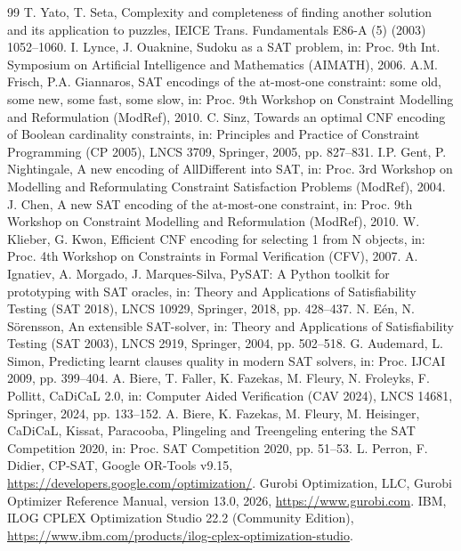 \begin{thebibliography}{99}
\small
{} T. Yato, T. Seta, Complexity and completeness of finding another solution and its application to puzzles, IEICE Trans. Fundamentals E86-A (5) (2003) 1052--1060.
 I. Lynce, J. Ouaknine, Sudoku as a SAT problem, in: Proc. 9th Int. Symposium on Artificial Intelligence and Mathematics (AIMATH), 2006.
 A.M. Frisch, P.A. Giannaros, SAT encodings of the at-most-one constraint: some old, some new, some fast, some slow, in: Proc. 9th Workshop on Constraint Modelling and Reformulation (ModRef), 2010.
 C. Sinz, Towards an optimal CNF encoding of Boolean cardinality constraints, in: Principles and Practice of Constraint Programming (CP 2005), LNCS 3709, Springer, 2005, pp. 827--831.
 I.P. Gent, P. Nightingale, A new encoding of AllDifferent into SAT, in: Proc. 3rd Workshop on Modelling and Reformulating Constraint Satisfaction Problems (ModRef), 2004.
 J. Chen, A new SAT encoding of the at-most-one constraint, in: Proc. 9th Workshop on Constraint Modelling and Reformulation (ModRef), 2010.
 W. Klieber, G. Kwon, Efficient CNF encoding for selecting 1 from N objects, in: Proc. 4th Workshop on Constraints in Formal Verification (CFV), 2007.
 A. Ignatiev, A. Morgado, J. Marques-Silva, PySAT: A Python toolkit for prototyping with SAT oracles, in: Theory and Applications of Satisfiability Testing (SAT 2018), LNCS 10929, Springer, 2018, pp. 428--437.
 N. E\'en, N. S\"orensson, An extensible SAT-solver, in: Theory and Applications of Satisfiability Testing (SAT 2003), LNCS 2919, Springer, 2004, pp. 502--518.
 G. Audemard, L. Simon, Predicting learnt clauses quality in modern SAT solvers, in: Proc. IJCAI 2009, pp. 399--404.
 A. Biere, T. Faller, K. Fazekas, M. Fleury, N. Froleyks, F. Pollitt, CaDiCaL 2.0, in: Computer Aided Verification (CAV 2024), LNCS 14681, Springer, 2024, pp. 133--152.
 A. Biere, K. Fazekas, M. Fleury, M. Heisinger, CaDiCaL, Kissat, Paracooba, Plingeling and Treengeling entering the SAT Competition 2020, in: Proc. SAT Competition 2020, pp. 51--53.
 L. Perron, F. Didier, CP-SAT, Google OR-Tools v9.15, \url{https://developers.google.com/optimization/}.
 Gurobi Optimization, LLC, Gurobi Optimizer Reference Manual, version 13.0, 2026, \url{https://www.gurobi.com}.
 IBM, ILOG CPLEX Optimization Studio 22.2 (Community Edition), \url{https://www.ibm.com/products/ilog-cplex-optimization-studio}.
\end{thebibliography}

